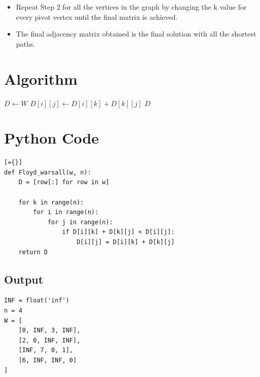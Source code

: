 \documentclass{article}
\begin{document}
{\begin{itemize}
\[
A_1[i,j] =
\begin{cases}
A[i,1] + A[1,j], & \text{if } A[i,j] > A[i,1] + A[1,j], \\
A[i,j], & \text{otherwise.}
\end{cases}
\]

In this step, the pivot vertex is the first vertex, i.e., $k = 1$.
    \item Repeat Step 2 for all the vertices in the graph by changing the k value for every pivot vertex until the final matrix is achieved.
    \item  The final adjacency matrix obtained is the final solution with all the shortest paths.
\end{itemize}
\pagebreak
\section*{Algorithm}
\begin{algorithm}
\caption{Quick Sort}
\begin{algorithmic}[1]

    \State $D \gets W$
                    \State $D[i][j] \gets D[i][k] + D[k][j]$
                \EndIf
            \EndFor
        \EndFor
    \EndFor
    \State \Return $D$
\EndProcedure
\end{algorithmic}
\end{algorithm}

\section*{Python Code}
\begin{lstlisting}[={}]
def Floyd_warsall(w, n):
    D = [row[:] for row in w]

    for k in range(n):
        for i in range(n):
            for j in range(n):
                if D[i][k] + D[k][j] < D[i][j]:
                    D[i][j] = D[i][k] + D[k][j]
    return D
\end{lstlisting}

\subsection*{Output}
\begin{lstlisting}
INF = float('inf')
n = 4
W = [
    [0, INF, 3, INF],
    [2, 0, INF, INF],
    [INF, 7, 0, 1],
    [6, INF, INF, 0]
]


\end{lstlisting}}
\end{document}
